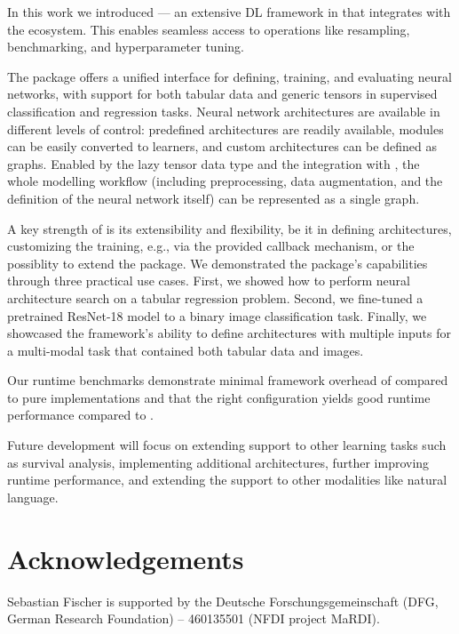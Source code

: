 \documentclass[article]{jss}
\theoremstyle{definition}
\begin{document}
In this work we introduced  --- an extensive DL framework in \rlang{} that integrates with the \mlrt{} ecosystem.
This enables seamless access to operations like resampling, benchmarking, and hyperparameter tuning.

The package offers a unified interface for defining, training, and evaluating neural networks, with support for both tabular data and generic tensors in supervised classification and regression tasks.
Neural network architectures are available in different levels of control: predefined architectures are readily available, \torch{} modules can be easily converted to \mlrttorch{} learners, and custom architectures can be defined as graphs.
Enabled by the lazy tensor data type and the integration with \mlrtpipelines{}, the whole modelling workflow (including preprocessing, data augmentation, and the definition of the neural network itself) can be represented as a single graph.

A key strength of  is its extensibility and flexibility, be it in defining architectures, customizing the training, e.g., via the provided callback mechanism, or the possiblity to extend the package.
We demonstrated the package's capabilities through three practical use cases. First, we showed how to perform neural architecture search on a tabular regression problem.
Second, we fine-tuned a pretrained ResNet-18 model to a binary image classification task.
Finally, we showcased the framework's ability to define architectures with multiple inputs for a multi-modal task that contained both tabular data and images.

Our runtime benchmarks demonstrate minimal framework overhead of \mlrttorch{} compared to pure \torch{} implementations and that the right configuration yields good runtime performance compared to \pytorch{}.

Future development will focus on extending support to other learning tasks such as survival analysis, implementing additional architectures, further improving runtime performance, and extending the support to other modalities like natural language.



%

\section*{Acknowledgements}

Sebastian Fischer is supported by the Deutsche Forschungsgemeinschaft (DFG, German Research Foundation) – 460135501 (NFDI project MaRDI).
\end{document}
